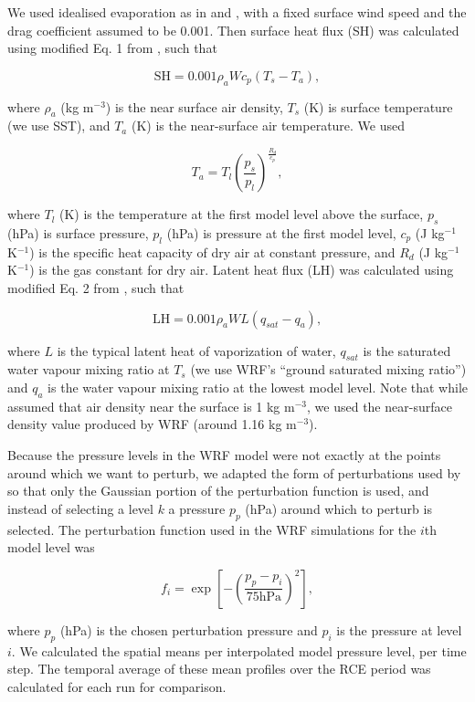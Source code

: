 \documentclass[draft]{agujournal2019}
\begin{document}
We used idealised evaporation as in  and
, with a fixed surface wind speed and the drag
coefficient assumed to be 0.001. Then surface heat flux (SH) was calculated
using modified Eq. 1 from , such that

$$
\textrm{SH} = 0.001 \rho_a W c_p (T_s - T_a),
$$

\noindent where $\rho_a$ (kg m$^{-3}$) is the near surface air density, $T_s$
(K) is surface temperature (we use SST), and $T_a$ (K) is the near-surface air
temperature. We used 

$$
T_a = T_l \left(\frac{p_s}{p_l}\right)^{\frac{R_d}{c_p}},
$$

\noindent where $T_l$ (K) is the temperature at the first model level above the
surface, $p_s$ (hPa) is surface pressure, $p_l$ (hPa) is pressure at the first
model level, $c_p$ (J kg$^{-1}$ K$^{-1}$) is the specific heat capacity of dry
air at constant pressure, and $R_d$ (J kg$^{-1}$ K$^{-1}$) is the gas constant
for dry air. Latent heat flux (LH) was calculated using modified Eq. 2 from
, such that

$$
\textrm{LH} = 0.001 \rho_a W L (q_{sat} - q_a),
$$

\noindent where $L$ is the typical latent heat of vaporization of water,
$q_{sat}$ is the saturated water vapour mixing ratio at $T_s$ (we use WRF's
``ground saturated mixing ratio'') and $q_a$ is the water vapour mixing ratio at
the lowest model level. Note that while  assumed that air
density near the surface is 1 kg m$^{-3}$, we used the near-surface density
value produced by WRF (around 1.16 kg m$^{-3}$).

Because the pressure levels in the WRF model were not exactly at the points
around which we want to perturb, we adapted the form of perturbations used by
 so that only the Gaussian portion of the perturbation
function is used, and instead of selecting a level $k$ a pressure $p_p$ (hPa)
around which to perturb is selected. The perturbation function used in the WRF
simulations for the $i$th model level was

$$
f_i = \exp\left[ - \left( \frac{p_p - p_i}{75 \textrm{hPa}}\right)^2 \right],
$$

\noindent where $p_p$ (hPa) is the chosen perturbation pressure and $p_i$ is the
pressure at level $i$. We calculated the spatial means per interpolated model
pressure level, per time step. The temporal average of these mean profiles over
the RCE period was calculated for each run for comparison.
\end{document}
